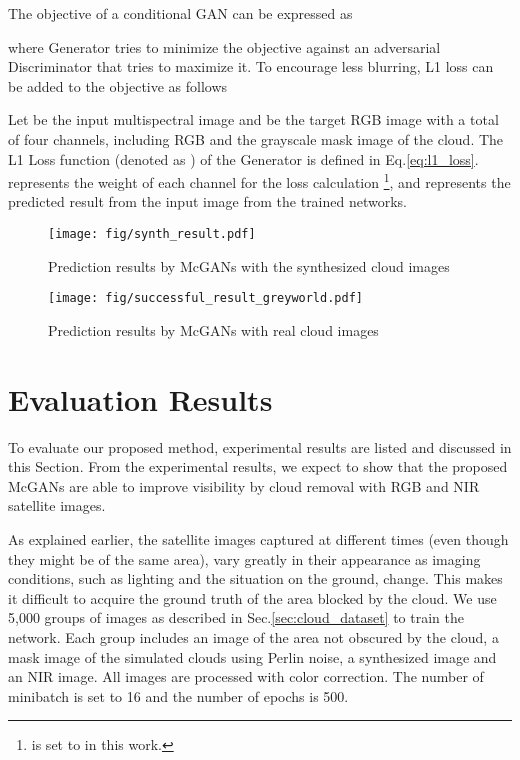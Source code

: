 \documentclass[10pt,twocolumn,letterpaper]{article}
\begin{document}
The objective of a conditional GAN can be expressed as


where Generator  tries to minimize the objective against an adversarial Discriminator  that tries to maximize it.
To encourage less blurring, L1 loss can be added to the objective as follows \cite{isola2016image}


Let  be the input multispectral image and  be the target RGB image with a total of four channels, including RGB and the grayscale mask image of the cloud. The L1 Loss function (denoted as ) of the Generator is defined in Eq.\ref{eq:l1_loss}. 
 represents the weight of each channel for the loss calculation \footnote{ is set to  in this work.}, and  represents the predicted result from the input image  from the trained networks.


\begin{figure*}[!t]
\begin{center}
\hspace*{0mm}\texttt{[image: fig/synth\_result.pdf]}


\caption{Prediction results by McGANs with the synthesized cloud images}
\label{fig:result02}
\end{center}
\end{figure*}

\begin{figure*}[htb]
\begin{center}
\vspace{-5mm}
\hspace*{0mm}\texttt{[image: fig/successful\_result\_greyworld.pdf]}
\vspace{-2mm}

\caption{Prediction results by McGANs with real cloud images}
\label{fig:result01}
\end{center}
\end{figure*}

\section{Evaluation Results}
To evaluate our proposed method, experimental results are listed and discussed in this Section. From the experimental results, we expect to show that the proposed McGANs are able to improve visibility by cloud removal with RGB and NIR satellite images.

As explained earlier, the satellite images captured at different times (even though they might be of the same area), vary greatly in their appearance as imaging conditions, such as lighting and the situation on the ground, change. This makes it difficult to acquire the ground truth of the area blocked by the cloud. We use 5,000 groups of images as described in Sec.\ref{sec:cloud_dataset} to train the network. Each group includes an image of the area not obscured by the cloud, a mask image of the simulated clouds using Perlin noise, a synthesized image and an NIR image. All images are 
 processed with color correction. The number of minibatch is set to 16 and the number of epochs is 500.
\end{document}

